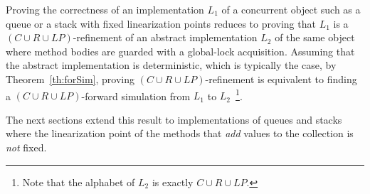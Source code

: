 Proving the correctness of an implementation $L_1$ of a concurrent object such as a queue or a stack with fixed linearization points
reduces to proving that $L_1$ is a $(C\cup R\cup LP)$-refinement of an abstract implementation $L_2$ of the same object where method
bodies are guarded with a global-lock acquisition. Assuming that the abstract implementation is deterministic, which is typically the case,
by Theorem~\ref{th:forSim}, proving $(C\cup R\cup LP)$-refinement is equivalent to finding a $(C\cup R\cup LP)$-forward simulation 
from $L_1$ to $L_2$~\footnote{Note that the alphabet of $L_2$ is exactly $C\cup R\cup LP$.}.

The next sections extend this result to implementations of queues and stacks where the linearization point of the methods 
that \emph{add} values to the collection is \emph{not} fixed.
